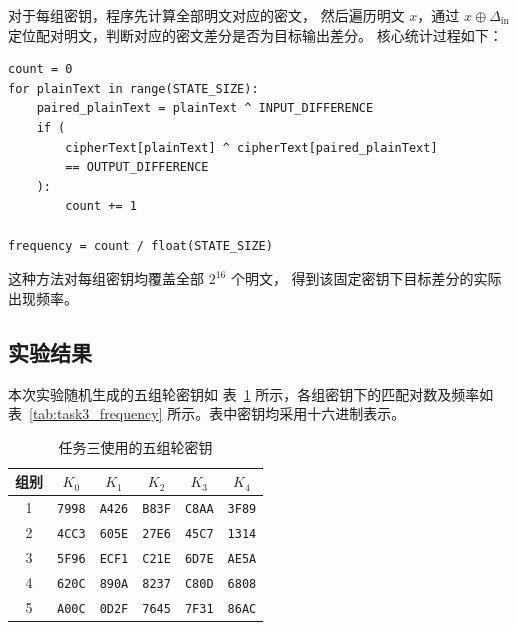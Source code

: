 对于每组密钥，程序先计算全部明文对应的密文，
然后遍历明文 $x$，通过 $x\oplus\Delta_{\mathrm{in}}$
定位配对明文，判断对应的密文差分是否为目标输出差分。
核心统计过程如下：
\begin{lstlisting}
count = 0
for plainText in range(STATE_SIZE):
    paired_plainText = plainText ^ INPUT_DIFFERENCE
    if (
        cipherText[plainText] ^ cipherText[paired_plainText]
        == OUTPUT_DIFFERENCE
    ):
        count += 1

frequency = count / float(STATE_SIZE)
\end{lstlisting}

这种方法对每组密钥均覆盖全部 $2^{16}$ 个明文，
得到该固定密钥下目标差分的实际出现频率。

\subsection{实验结果}

本次实验随机生成的五组轮密钥如
表~\ref{tab:task3_keys} 所示，各组密钥下的匹配对数及频率如
表~\ref{tab:task3_frequency} 所示。表中密钥均采用十六进制表示。

\begin{table}[H]
    \centering
    \caption{任务三使用的五组轮密钥}
    \label{tab:task3_keys}
    \small
    \renewcommand{\arraystretch}{1.2}
    \begin{tabular}{cccccc}
        \toprule
        组别 & $K_0$ & $K_1$ & $K_2$ & $K_3$ & $K_4$ \\
        \midrule
        1 & \texttt{7998} & \texttt{A426} & \texttt{B83F}
          & \texttt{C8AA} & \texttt{3F89} \\
        2 & \texttt{4CC3} & \texttt{605E} & \texttt{27E6}
          & \texttt{45C7} & \texttt{1314} \\
        3 & \texttt{5F96} & \texttt{ECF1} & \texttt{C21E}
          & \texttt{6D7E} & \texttt{AE5A} \\
        4 & \texttt{620C} & \texttt{890A} & \texttt{8237}
          & \texttt{C80D} & \texttt{6808} \\
        5 & \texttt{A00C} & \texttt{0D2F} & \texttt{7645}
          & \texttt{7F31} & \texttt{86AC} \\
        \bottomrule
    \end{tabular}
\end{table}

